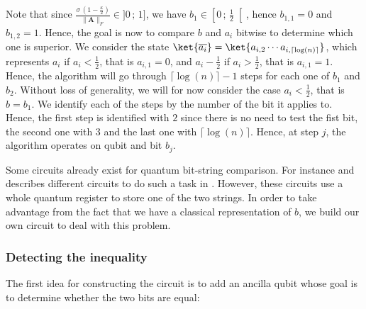 \documentclass[11pt, a4paper]{article}
\begin{document}
                Note that since \(\frac{\sigma\,\left(1 - \frac\kappa2\right)}{\|\mathbf{A}\|_F}\in]0\,;\,1]\), we have \(b_1\in\left[0\,;\,\frac12\right[\), hence \(b_{1,1}=0\) and \(b_{1,2}=1\). Hence, the goal is now to compare \(b\) and \(a_i\) bitwise to determine which one is superior. We consider the state \(\ket{\overline{a_i}} = \ket{a_{i,2}\cdots a_{i,\lceil\log(n)\rceil}}\), which represents \(a_i\) if \(a_i<\frac12\), that is \(a_{i,1}=0\), and \(a_i-\frac12\) if \(a_i>\frac12\), that is \(a_{i, 1} = 1\). Hence, the algorithm will go through \(\lceil\log(n)\rceil - 1\) steps for each one of \(b_1\) and \(b_2\). Without loss of generality, we will for now consider the case \(a_i<\frac12\), that is \(b=b_1\). We identify each of the steps by the number of the bit it applies to. Hence, the first step is identified with \(2\) since there is no need to test the fist bit, the second one with \(3\) and the last one with \(\lceil\log(n)\rceil\). Hence, at step \(j\), the algorithm operates on qubit  and bit \(b_j\).
                
                Some circuits already exist for quantum bit-string comparison. For instance \citeauthor{QBSC} and describes different circuits to do such a task in \cite{QBSC}. However, these circuits use a whole quantum register to store one of the two strings. In order to take advantage from the fact that we have a classical representation of \(b\), we build our own circuit to deal with this problem.
                
            \subsubsection{Detecting the inequality}
                The first idea for constructing the circuit is to add an ancilla qubit whose goal is to determine whether the two bits are equal:
                
\end{document}
